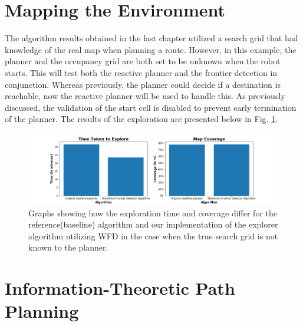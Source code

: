 \documentclass[a4paper,12pt]{article}
\begin{document}
	
	
	\section{Mapping the Environment}
		The algorithm results obtained in the last chapter utilized a search grid that had knowledge of the real map when planning a route. However, in this example, the planner and the occupancy grid are both set to be unknown when the robot starts. This will test both the reactive planner and the frontier detection in conjunction. Whereas previously, the planner could decide if a destination is reachable, now the reactive planner will be used to handle this. As previously discussed, the validation of the start cell is disabled to prevent early termination of the planner. The results of the exploration are presented below in Fig. \ref{Part3}. 

		\begin{figure}[H]
			\centering
			\includegraphics[scale=0.5]{images/Part3.png}
			\caption{Graphs showing how the exploration time and coverage differ for the reference(baseline) algorithm and our implementation of the explorer algorithm utilizing WFD in the case when the true search grid is not known to the planner.}
			\label{Part3}
		\end{figure}
	
	
	\section{Information-Theoretic Path Planning}
	
	
	
	\newpage
	
	
	\newpage
	\appendix
	\appendixpage
	\addappheadtotoc
	
\end{document}
